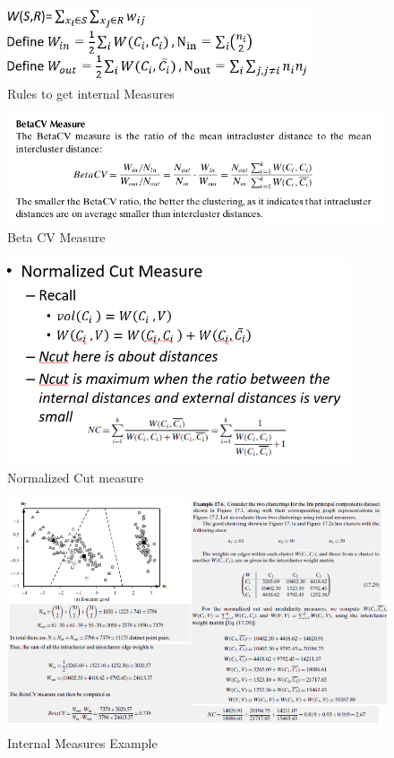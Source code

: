 \begin{itemize}
    \begin{figure}[H]
        \centerline{\includegraphics[width=0.8\textwidth]{Figures/internalmes.png}}
        \caption{\label{fig:figure14}Rules to get internal Measures}
    \end{figure}
    \begin{figure}[H]
        \centerline{\includegraphics[width=1.1\textwidth]{Figures/beta.png}}
        \caption{\label{fig:figure15}Beta CV Measure}
    \end{figure}
    \begin{figure}[H]
        \centerline{\includegraphics[width=0.9\textwidth]{Figures/internalmes2.png}}
        \caption{\label{fig:figure16}Normalized Cut measure}
    \end{figure}
    \begin{figure}[H]
        \caption{\label{fig:figure}Internal Measures Example}
        \centerline{\includegraphics[width=1.5\textwidth]{Figures/cluster}}

\end{figure}
\end{itemize}
